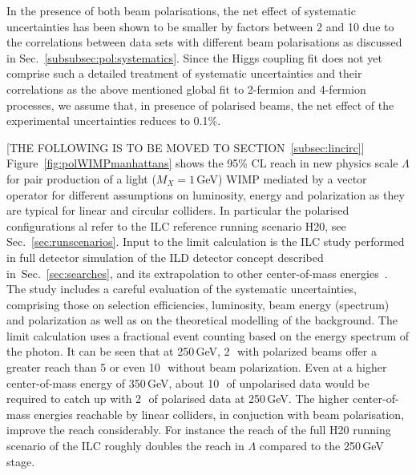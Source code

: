 \begin{itemize}
In the presence of both beam polarisations, the net effect of systematic uncertainties has been shown to be smaller by factors between 2 and 10 due to the correlations between data sets with different beam polarisations as discussed in Sec.~\ref{subsubsec:pol:systematics}. Since the Higgs coupling fit does not yet comprise such a detailed treatment of systematic uncertainties and their correlations as the above mentioned global fit to 2-fermion and 4-fermion processes, we assume that, in presence of polarised beams, the net effect of the experimental uncertainties reduces to 0.1\%.
\end{itemize}



{\color{red}[THE FOLLOWING IS TO BE MOVED TO SECTION~\ref{subsec:lincirc}]}\\
Figure~\ref{fig:polWIMPmanhattans} shows the 95\% CL reach in new physics scale $\Lambda$ for pair production of a light ($M_{X} = 1$\,GeV) WIMP mediated by a vector operator for different assumptions on luminosity, energy and polarization 
as they are typical for linear and circular colliders. In particular the polarised
configurations al refer to the ILC reference running scenario H20, see Sec.~\ref{sec:runscenarios}. Input to the limit calculation is the ILC study performed in full detector simulation of the ILD detector concept described in~Sec.~\ref{sec:searches}, and its extrapolation to other center-of-mass energies~\cite{Habermehl:417605}. The study includes a careful evaluation of the systematic uncertainties, comprising those on selection efficiencies, luminosity, beam energy (spectrum) and polarization as well as on the theoretical modelling of the background. The limit calculation uses a fractional event counting based on the 
energy spectrum of the photon. It can be seen that at 250\,GeV, 2\,\iab\ with polarized beams offer a greater reach than 5 or even 10\,\iab\ without beam polarization. Even at a higher center-of-mass energy of 350\,GeV, about 10\,\iab\ of unpolarised data  would be required to catch up with 2\,\iab\ of polarised data at 250\,GeV. The higher center-of-mass energies reachable by linear colliders, in conjuction with beam polarisation, improve the reach considerably. For instance the reach of the full H20 running scenario of the ILC roughly doubles the reach in $\Lambda$ compared to the 250\,GeV stage.

